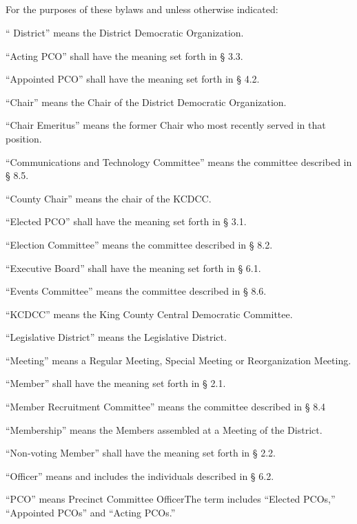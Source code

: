 \documentclass{article}
\newcommand{\fortythird}{\nth{43}}
\newcommand{\district}{\fortythird{} District}
\newcommand{\thedistrict}{the \district{}}
\newcommand{\theLD}{the \fortythird{} Legislative District}
\begin{document}
\subsection{}
For the purposes of these bylaws and unless otherwise indicated:
\begin{alphalist}
    \item “ District” means \thedistrict{} Democratic Organization.
    \item “Acting PCO” shall have the meaning set forth in § 3.3.
    \item “Appointed PCO” shall have the meaning set forth in § 4.2.
    \item “Chair” means the Chair of \thedistrict{} Democratic Organization.
    \item “Chair Emeritus” means the former Chair who most recently served in that position.
    \item “Communications and Technology Committee” means the committee described in § 8.5.
    \item “County Chair” means the chair of the KCDCC.
    \item “Elected PCO” shall have the meaning set forth in § 3.1.
    \item “Election Committee” means the committee described in § 8.2.
    \item “Executive Board” shall have the meaning set forth in § 6.1.
    \item “Events Committee” means the committee described in § 8.6.
    \item “KCDCC” means the King County Central Democratic Committee.
    \item “Legislative District” means \theLD{}.
    \item “Meeting” means a Regular Meeting, Special Meeting or Reorganization Meeting.
    \item “Member” shall have the meaning set forth in § 2.1.
    \item “Member Recruitment Committee” means the committee described in § 8.4
    \item “Membership” means the Members assembled at a Meeting of \thedistrict{}.
    \item “Non-voting Member” shall have the meaning set forth in § 2.2.
    \item “Officer” means and includes the individuals described in § 6.2.
    \item “PCO” means Precinct Committee OfficerThe term includes “Elected PCOs,” “Appointed PCOs” and “Acting PCOs.”

\end{alphalist}
\end{document}
